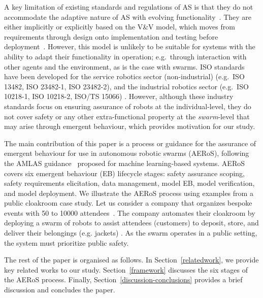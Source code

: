 \documentclass[runningheads]{llncs}
\begin{document}
A key limitation of existing standards and regulations of AS is that they do not accommodate the adaptive nature of AS with evolving functionality~\cite{Fisher2020}. 
They are either implicitly or explicitly based on the V\&V model, which moves from requirements through design onto implementation and testing before deployment~\cite{Jia2021}. 
However, this model is unlikely to be suitable for systems with the ability to adapt their functionality in operation; e.g.\ through interaction with other agents and the environment, as is the case with swarms. 
ISO standards have been developed for the service robotics sector (non-industrial) (e.g.\ ISO 13482, ISO 23482-1, ISO 23482-2), and the industrial robotics sector (e.g.\ ISO 10218-1, ISO 10218-2, ISO/TS 15066) \cite{Abeywickrama2022}. 
However, although these industry standards focus on ensuring assurance of robots at the individual-level, they do not cover safety or any other extra-functional property at the \emph{swarm}-level that may arise through emergent behaviour, which provides motivation for our study.


The main contribution of this paper is a process or guidance for the assurance of emergent behaviour for use in autonomous robotic swarms (AERoS), following the AMLAS guidance~\cite{Hawkins2021} proposed for machine learning-based systems. 
AERoS covers six emergent behaviour (EB) lifecycle stages: safety assurance scoping, safety requirements elicitation, data management, model EB, model verification, and model deployment. 
We illustrate the AERoS process using examples from a public cloakroom case study. 
Let us consider a company that organizes bespoke events with 50 to 10000 attendees~\cite{Jia2021}. 
The company automates their cloakroom by deploying a swarm of robots to assist attendees (customers) to deposit, store, and deliver their belongings (e.g. jackets) \cite{Jones2020}. 
As the swarm operates in a public setting, the system must prioritize public safety.

The rest of the paper is organised as follows. 
In Section~\ref{relatedwork}, we provide key related works to our study. Section~\ref{framework} discusses the six stages of the AERoS process. Finally, Section~\ref{discussion-conclusions} provides a brief discussion and concludes the paper. 
%
%
\end{document}
